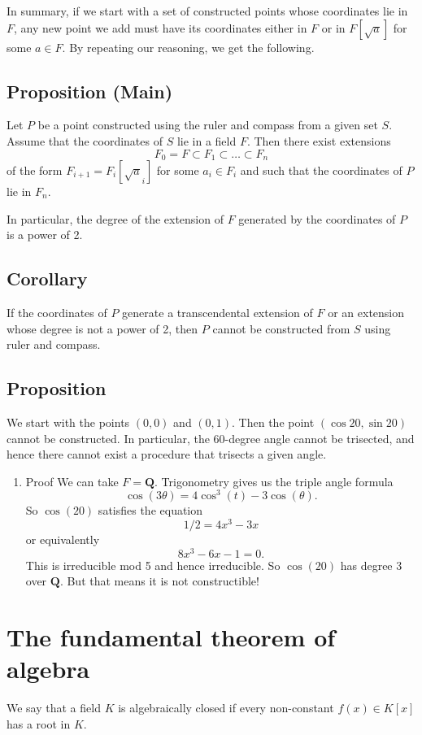\documentclass[11pt]{article}
\begin{document}
In summary, if we start with a set of constructed points whose coordinates lie in \(F\), any new point we add must have its coordinates either in \(F\) or in \(F[\sqrt a]\) for some \(a \in F\).  By repeating our reasoning, we get the following.
\subsection{Proposition (Main)}
\label{sec:org181cad1}
Let \(P\) be a point constructed using the ruler and compass from a given set \(S\).
Assume that the coordinates of \(S\) lie in a field \(F\).
Then there exist extensions
\[ F_{0} = F \subset F_1 \subset \dots \subset F_{n}\]
of the form \(F_{i+1} = F_i[\sqrt a_i]\) for some \(a_i \in F_i\) and such that the coordinates of \(P\) lie in \(F_{n}\).

In particular, the degree of the extension of \(F\) generated by the coordinates of \(P\) is a power of 2.
\subsection{Corollary}
\label{sec:org6e671b0}
If the coordinates of \(P\) generate a transcendental extension of \(F\) or an extension whose degree is not a power of 2, then \(P\) cannot be constructed from \(S\) using ruler and compass.
\subsection{Proposition}
\label{sec:org0356e0d}
We start with the points \((0,0)\) and \((0,1)\).
Then the point \((\cos 20, \sin 20)\) cannot be constructed.
In particular, the \(60\)-degree angle cannot be trisected, and hence there cannot exist a procedure that trisects a given angle.
\begin{enumerate}
\item Proof
\label{sec:org89d2c2a}
We can take \(F = \mathbf{Q}\).
Trigonometry gives us the triple angle formula
\[ \cos(3\theta) = 4 \cos^3(t) - 3 \cos(\theta).\]
So \(\cos(20)\) satisfies the equation
\[ 1/2 = 4 x^3 - 3x\]
or equivalently
\[ 8x^3-6x-1 = 0.\]
This is irreducible mod 5 and hence irreducible.
So \(\cos(20)\) has degree 3 over \(\mathbf{Q}\).
But that means it is not constructible!
\end{enumerate}
\section{The fundamental theorem of algebra}
\label{sec:org8f2095d}
We say that a field \(K\) is algebraically closed if every non-constant \(f(x) \in K[x]\) has a root in \(K\).
\end{document}
